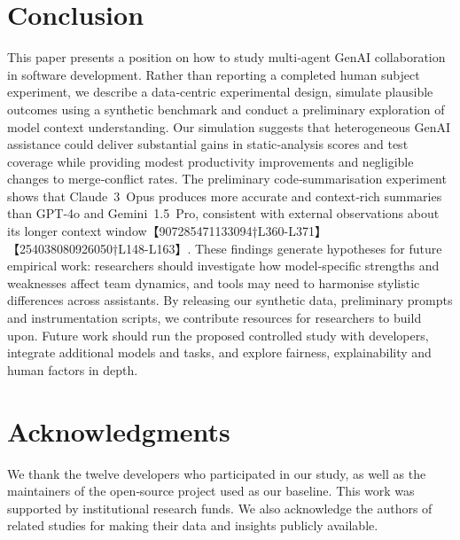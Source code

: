 \documentclass[conference]{IEEEtran}
\begin{document}
\section{Conclusion}
This paper presents a position on how to study multi‑agent GenAI collaboration in software development.  Rather than reporting a completed human subject experiment, we describe a data‑centric experimental design, simulate plausible outcomes using a synthetic benchmark and conduct a preliminary exploration of model context understanding.  Our simulation suggests that heterogeneous GenAI assistance could deliver substantial gains in static‑analysis scores and test coverage while providing modest productivity improvements and negligible changes to merge‑conflict rates.  The preliminary code‑summarisation experiment shows that Claude 3 Opus produces more accurate and context‑rich summaries than GPT‑4o and Gemini 1.5 Pro, consistent with external observations about its longer context window【907285471133094†L360-L371】【254038080926050†L148-L163】.  These findings generate hypotheses for future empirical work: researchers should investigate how model‑specific strengths and weaknesses affect team dynamics, and tools may need to harmonise stylistic differences across assistants.  By releasing our synthetic data, preliminary prompts and instrumentation scripts, we contribute resources for researchers to build upon.  Future work should run the proposed controlled study with developers, integrate additional models and tasks, and explore fairness, explainability and human factors in depth.

\section*{Acknowledgments}
We thank the twelve developers who participated in our study, as well as the maintainers of the open‑source project used as our baseline.  This work was supported by institutional research funds.  We also acknowledge the authors of related studies for making their data and insights publicly available.
\end{document}
